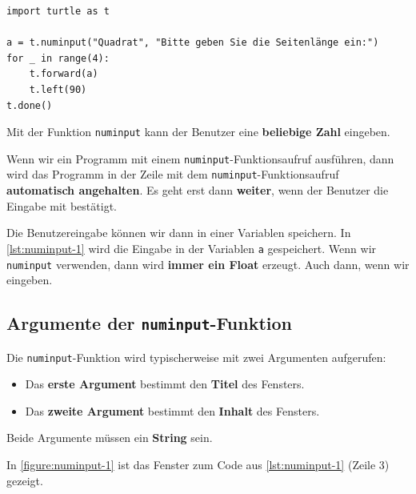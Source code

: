 \begin{lstlisting}[language={python3}, label={lst:numinput-1}, caption={Wenn wir das Programm ausführen, dann öffnet sich ein Fenster für die Eingabe.}]
import turtle as t

a = t.numinput("Quadrat", "Bitte geben Sie die Seitenlänge ein:")
for _ in range(4):
	t.forward(a)
	t.left(90)
t.done()

\end{lstlisting}

Mit der Funktion \lstinline[language={python3}]{numinput} kann der Benutzer eine \textbf{beliebige Zahl} eingeben.

\begin{important}
	Wenn wir ein Programm mit einem \lstinline[language={python3}]{numinput}-Funktionsaufruf ausführen, dann wird das Programm in der Zeile mit dem \lstinline[language={python3}]{numinput}-Funktionsaufruf \textbf{automatisch angehalten}. Es geht erst dann \textbf{weiter}, wenn der Benutzer die Eingabe mit \textbf{} bestätigt.
\end{important}

Die Benutzereingabe können wir dann in einer Variablen speichern. In \autoref{lst:numinput-1} wird die Eingabe in der Variablen \lstinline[language={python3}]{a} gespeichert. Wenn wir \lstinline[language={python3}]{numinput} verwenden, dann wird \textbf{immer ein Float} erzeugt. Auch dann, wenn wir  eingeben.

\subsection{Argumente der  \lstinline[language={python3}]{numinput}-Funktion}
\label{subsec:numinput-argumente}

Die \lstinline[language={python3}]{numinput}-Funktion wird typischerweise mit zwei Argumenten aufgerufen:

\begin{itemize}
\item Das \textbf{erste Argument} bestimmt den \textbf{Titel} des Fensters.
\item Das \textbf{zweite Argument} bestimmt den \textbf{Inhalt} des Fensters.
\end{itemize}

Beide Argumente müssen ein \textbf{String} sein.

\begin{example}
In \autoref{figure:numinput-1} ist das Fenster zum Code aus \autoref{lst:numinput-1} (Zeile 3) gezeigt.
\end{example}

